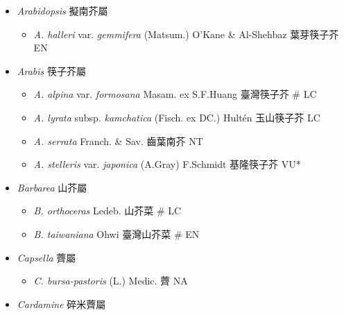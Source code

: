 
  \begin{itemize}
 \item[] \textit{Arabidopsis} 擬南芥屬
                                
  \begin{itemize}
        \item[] \textit{A. halleri} var. \textit{gemmifera} (Matsum.) O'Kane \& Al-Shehbaz  葉芽筷子芥   EN
  \end{itemize}
 \item[] \textit{Arabis} 筷子芥屬
                                
  \begin{itemize}
        \item[] \textit{A. alpina} var. \textit{formosana} Masam. ex S.F.Huang  臺灣筷子芥  \# LC
        \item[] \textit{A. lyrata} subsp. \textit{kamchatica} (Fisch. ex DC.) Hultén  玉山筷子芥   LC
        \item[] \textit{A. serrata} Franch. \& Sav.  齒葉南芥   NT
        \item[] \textit{A. stelleris} var. \textit{japonica} (A.Gray) F.Schmidt  基隆筷子芥   VU*
  \end{itemize}
 \item[] \textit{Barbarea} 山芥屬
                                
  \begin{itemize}
        \item[] \textit{B. orthoceras} Ledeb.  山芥菜  \# LC
        \item[] \textit{B. taiwaniana} Ohwi  臺灣山芥菜  \# EN
  \end{itemize}
 \item[] \textit{Capsella} 薺屬
                                
  \begin{itemize}
        \item[] \textit{C. bursa-pastoris} (L.) Medic.  薺   NA
  \end{itemize}
 \item[] \textit{Cardamine} 碎米薺屬
                                

\end{itemize}
